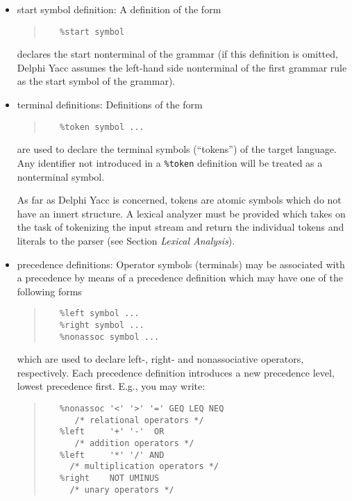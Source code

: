 \documentclass[a4paper]{article}
\begin{document}
\begin{itemize}
   \item
      start symbol definition: A definition of the form
      \begin{quote}\begin{verbatim}
   %start symbol
      \end{verbatim}\end{quote}
      declares the start nonterminal of the grammar (if this definition is
      omitted, Delphi Yacc assumes the left-hand side nonterminal of the first
      grammar rule as the start symbol of the grammar).
   \item
      terminal definitions: Definitions of the form
      \begin{quote}\begin{verbatim}
   %token symbol ...
      \end{verbatim}\end{quote}
      are used to declare the terminal symbols (``tokens'') of the target
      language. Any identifier not introduced in a \verb"%token" definition
      will be treated as a nonterminal symbol.
    
      As far as Delphi Yacc is concerned, tokens are atomic symbols which do not
      have an innert structure. A lexical analyzer must be provided which
      takes on the task of tokenizing the input stream and return the
      individual tokens and literals to the parser (see Section {\em Lexical
      Analysis\/}).
   \item
      precedence definitions: Operator symbols (terminals) may be associated
      with a precedence by means of a precedence definition which may have
      one of the following forms
      \begin{quote}\begin{verbatim}
   %left symbol ...
   %right symbol ...
   %nonassoc symbol ...
      \end{verbatim}\end{quote}
      which are used to declare left-, right- and nonassociative operators,
      respectively. Each precedence definition introduces a new precedence
      level, lowest precedence first. E.g., you may write:
      \begin{quote}\begin{verbatim}
   %nonassoc '<' '>' '=' GEQ LEQ NEQ
      /* relational operators */
   %left     '+' '-'  OR
      /* addition operators */
   %left     '*' '/' AND
     /* multiplication operators */
   %right    NOT UMINUS
     /* unary operators */
      \end{verbatim}\end{quote}


\end{itemize}
\end{document}
